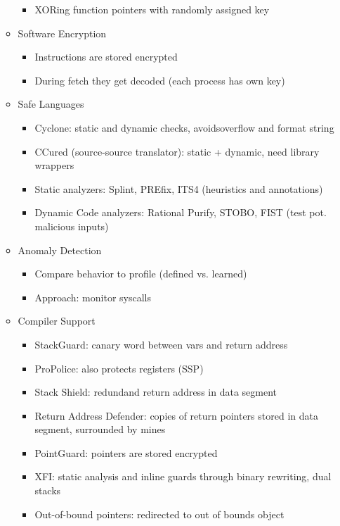 \documentclass[11pt, paper=a4, twocolumn]{scrartcl}
\begin{document}
\begin{itemize}
\begin{itemize}
\begin{itemize}
							\item XORing function pointers with randomly assigned key
						\end{itemize}
					\item Software Encryption
						\begin{itemize}
							\item Instructions are stored encrypted
							\item During fetch they get decoded (each process has own key)
						\end{itemize}
					\item Safe Languages
						\begin{itemize}
							\item Cyclone: static and dynamic checks, avoidsoverflow and format string
							\item CCured (source-source translator): static + dynamic, need library wrappers
							\item Static analyzers: Splint, PREfix, ITS4 (heuristics and annotations)
							\item Dynamic Code analyzers: Rational Purify, STOBO, FIST (test pot. malicious inputs)
						\end{itemize}
					\item Anomaly Detection
						\begin{itemize}
							\item Compare behavior to profile (defined vs. learned)
							\item Approach: monitor syscalls
						\end{itemize}
					\item Compiler Support
						\begin{itemize}
							\item StackGuard: canary word between vars and return address
							\item ProPolice: also protects registers (SSP)
							\item Stack Shield: redundand return address in data segment
							\item Return Address Defender: copies of return pointers stored in data segment, surrounded by mines
							\item PointGuard: pointers are stored encrypted
							\item XFI: static analysis and inline guards through binary rewriting, dual stacks
							\item Out-of-bound pointers: redirected to out of bounds object
						\end{itemize}

\end{itemize}
\end{itemize}
\end{document}
